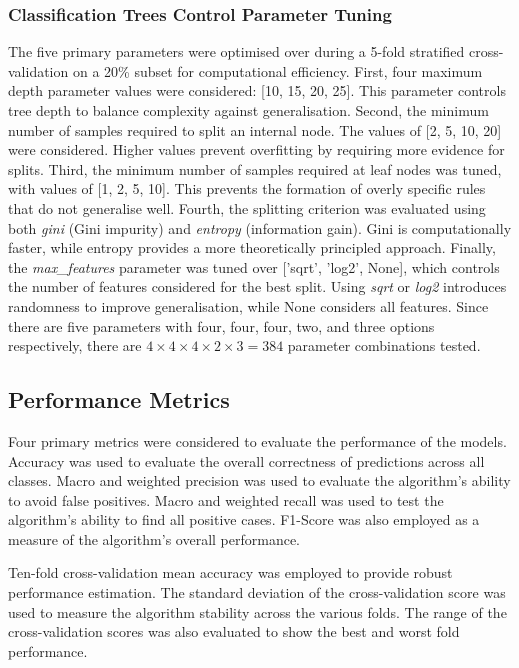 \documentclass[conference]{IEEEtran}
\begin{document}
\subsubsection{Classification Trees Control Parameter Tuning}
The five primary parameters were optimised over during a 5-fold stratified cross-validation on a 20\% subset for computational efficiency.  First, four maximum depth parameter values were considered: [10, 15, 20, 25]. This parameter controls tree depth to balance complexity against generalisation. Second, the minimum number of samples required to split an internal node. The values of [2, 5, 10, 20] were considered. Higher values prevent overfitting by requiring more evidence for splits. Third, the minimum number of samples required at leaf nodes was tuned, with values of [1, 2, 5, 10]. This prevents the formation of overly specific rules that do not generalise well. Fourth, the splitting criterion was evaluated using both \textit{gini} (Gini impurity) and \textit{entropy} (information gain). Gini is computationally faster, while entropy provides a more theoretically principled approach. Finally, the \textit{max\_features} parameter was tuned over ['sqrt', 'log2', None], which controls the number of features considered for the best split. Using \textit{sqrt} or \textit{log2} introduces randomness to improve generalisation, while None considers all features. Since there are five parameters with four, four, four, two, and three options respectively, there are $4 \times 4 \times 4 \times 2 \times 3 = 384$ parameter combinations tested. 


\subsection{Performance Metrics}
Four primary metrics were considered to evaluate the performance of the models. Accuracy was used to evaluate the overall correctness of predictions across all classes.  Macro and weighted precision was used to evaluate the algorithm's ability to avoid false positives. Macro and weighted recall was used to test the algorithm's ability to find all positive cases. F1-Score was also employed as a measure of the algorithm's overall performance. 

Ten-fold cross-validation mean accuracy was employed to provide robust performance estimation. The standard deviation of the cross-validation score was used to measure the algorithm stability across the various folds. The range of the cross-validation scores was also evaluated to show the best and worst fold performance. 
\end{document}
